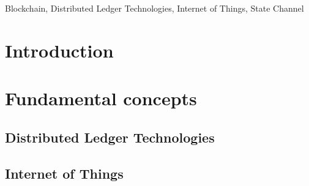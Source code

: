 \documentclass[conference]{IEEEtran}
\begin{document}
\begin{IEEEkeywords}
Blockchain, Distributed Ledger Technologies, Internet of Things, State Channel
\end{IEEEkeywords}



\section{Introduction}
\lipsum[1-1]


\section{Fundamental concepts}
\subsection{Distributed Ledger Technologies}
\lipsum[1-1]


\subsection{Internet of Things}
\lipsum[1-1]
\end{document}
